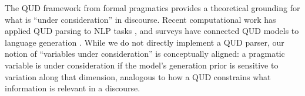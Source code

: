 The QUD framework from formal pragmatics \citep{roberts2012information} provides a theoretical grounding for what is ``under consideration'' in discourse. Recent computational work has applied QUD parsing to NLP tasks \citep{wu2024qudeval, ko2024qudselect}, and surveys have connected QUD models to language generation \citep{westera2025survey}. While we do not directly implement a QUD parser, our notion of ``variables under consideration'' is conceptually aligned: a pragmatic variable is under consideration if the model's generation prior is sensitive to variation along that dimension, analogous to how a QUD constrains what information is relevant in a discourse.
